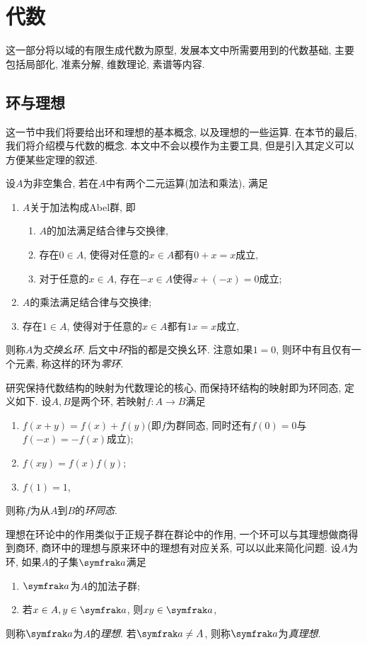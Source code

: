 
\section{代数}

这一部分将以域的有限生成代数为原型, 发展本文中所需要用到的代数基础, 主要包括局部化, 准素分解, 维数理论, 素谱等内容.

\subsection{环与理想}

这一节中我们将要给出环和理想的基本概念, 以及理想的一些运算. 在本节的最后, 我们将介绍模与代数的概念. 本文中不会以模作为主要工具, 但是引入其定义可以方便某些定理的叙述.

设$A$为非空集合, 若在$A$中有两个二元运算(加法和乘法), 满足
\begin{enumerate}
    \item $A$关于加法构成Abel群, 即
    \begin{enumerate}
        \item $A$的加法满足结合律与交换律,
        \item 存在$0\in A$, 使得对任意的$x\in A$都有$0+x=x$成立,
        \item 对于任意的$x\in A$, 存在$-x\in A$使得$x+(-x)=0$成立;
    \end{enumerate}
    \item $A$的乘法满足结合律与交换律;
    \item 存在$1\in A$, 使得对于任意的$x\in A$都有$1x=x$成立,
\end{enumerate}
则称$A$为\emph{交换幺环}. 后文中\emph{环}指的都是交换幺环. 注意如果$1=0$, 则环中有且仅有一个元素, 称这样的环为\emph{零环}\footnotemark .

研究保持代数结构的映射为代数理论的核心, 而保持环结构的映射即为环同态, 定义如下. 设$A, B$是两个环, 若映射$f\colon A\to B$满足
\begin{enumerate}
    \item $f(x+y)=f(x)+f(y)$(即$f$为群同态, 同时还有$f(0)=0$与$f(-x)=-f(x)$成立);
    \item $f(xy)=f(x)f(y)$;
    \item $f(1)=1$,
\end{enumerate}
则称$f$为从$A$到$B$的\emph{环同态}.

理想在环论中的作用类似于正规子群在群论中的作用, 一个环可以与其理想做商得到商环, 商环中的理想与原来环中的理想有对应关系, 可以以此来简化问题. 设$A$为环, 如果$A$的子集$\ideal{a}$满足
\begin{enumerate}
    \item $\ideal{a}$为$A$的加法子群;
    \item 若$x\in A, y\in\ideal{a}$, 则$xy\in\ideal{a}$,
\end{enumerate}
则称$\ideal{a}$为$A$的\emph{理想}. 若$\ideal{a}\neq A$, 则称$\ideal{a}$为\emph{真理想}\footnotemark .

